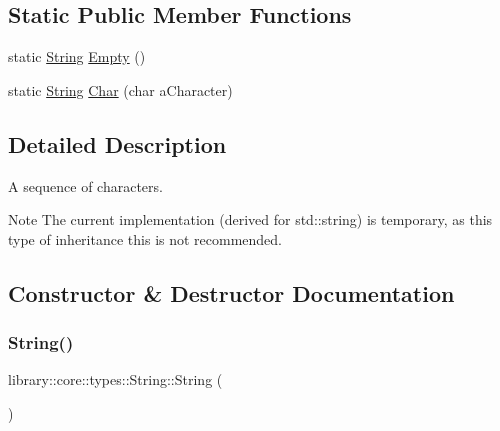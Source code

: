 \subsection*{Static Public Member Functions}
\begin{DoxyCompactItemize}
\item 
static \hyperlink{classlibrary_1_1core_1_1types_1_1_string}{String} \hyperlink{classlibrary_1_1core_1_1types_1_1_string_a4d359cb0dba46e14ca46f90e728c2b96}{Empty} ()
\item 
static \hyperlink{classlibrary_1_1core_1_1types_1_1_string}{String} \hyperlink{classlibrary_1_1core_1_1types_1_1_string_abbc5a795da1a72d1456ba4950e62602c}{Char} (char a\+Character)
\end{DoxyCompactItemize}


\subsection{Detailed Description}
A sequence of characters. 

\begin{DoxyNote}{Note}
The current implementation (derived for std\+::string) is temporary, as this type of inheritance this is not recommended. 
\end{DoxyNote}


\subsection{Constructor \& Destructor Documentation}
\mbox{\label{classlibrary_1_1core_1_1types_1_1_string_ab49dec039a75f0049c95759141b6d484}} 
\subsubsection{\texorpdfstring{String()}{String()}\hspace{0.1cm}{\footnotesize\ttfamily [1/2]}}
{\footnotesize\ttfamily library\+::core\+::types\+::\+String\+::\+String (\begin{DoxyParamCaption}{ }\end{DoxyParamCaption})}

\mbox{\label{classlibrary_1_1core_1_1types_1_1_string_a37c737528805786c49eab397ba7b64ae}} 

